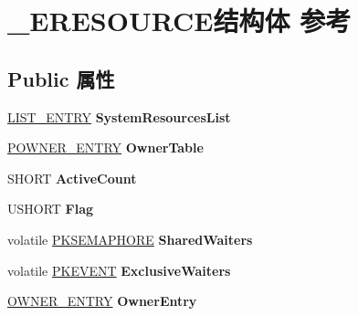 \hypertarget{struct___e_r_e_s_o_u_r_c_e}{}\section{\+\_\+\+E\+R\+E\+S\+O\+U\+R\+C\+E结构体 参考}
\label{struct___e_r_e_s_o_u_r_c_e}
\subsection*{Public 属性}
\begin{DoxyCompactItemize}
\item 
\mbox{\label{struct___e_r_e_s_o_u_r_c_e_a9dd67923e40552412670a3c77ae2f517}} 
\hyperlink{struct___l_i_s_t___e_n_t_r_y}{L\+I\+S\+T\+\_\+\+E\+N\+T\+RY} {\bfseries System\+Resources\+List}
\item 
\mbox{\label{struct___e_r_e_s_o_u_r_c_e_ac90151e62d097640d3a16985551d648a}} 
\hyperlink{struct___o_w_n_e_r___e_n_t_r_y}{P\+O\+W\+N\+E\+R\+\_\+\+E\+N\+T\+RY} {\bfseries Owner\+Table}
\item 
\mbox{\label{struct___e_r_e_s_o_u_r_c_e_ae4d68b597d64bfe17998bcf8a1749152}} 
S\+H\+O\+RT {\bfseries Active\+Count}
\item 
\mbox{\label{struct___e_r_e_s_o_u_r_c_e_abc0258c38d7e5fe8109ab0c948c33aec}} 
U\+S\+H\+O\+RT {\bfseries Flag}
\item 
\mbox{\label{struct___e_r_e_s_o_u_r_c_e_a5c23637d608ff8086780fd3c37abb715}} 
volatile \hyperlink{struct___k_s_e_m_a_p_h_o_r_e}{P\+K\+S\+E\+M\+A\+P\+H\+O\+RE} {\bfseries Shared\+Waiters}
\item 
\mbox{\label{struct___e_r_e_s_o_u_r_c_e_a79ee757b00ef4f47243a87883bca700f}} 
volatile \hyperlink{struct___k_e_v_e_n_t}{P\+K\+E\+V\+E\+NT} {\bfseries Exclusive\+Waiters}
\item 
\mbox{\label{struct___e_r_e_s_o_u_r_c_e_ac74980de6c26cfaf791f2f27600458bf}} 
\hyperlink{struct___o_w_n_e_r___e_n_t_r_y}{O\+W\+N\+E\+R\+\_\+\+E\+N\+T\+RY} {\bfseries Owner\+Entry}
\item 

\end{DoxyCompactItemize}
